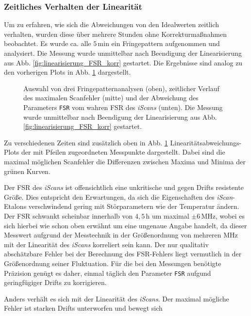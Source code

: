 \subsubsection{Zeitliches Verhalten
der Linearität}\label{subsubsec:linearitaet_verlauf}
Um zu erfahren, wie
sich die Abweichungen von den Idealwerten zeitlich verhalten, wurden diese über
mehrere Stunden ohne Korrekturmaßnahmen beobachtet. Es wurde ca. alle $5\,$min ein Fringepattern aufgenommen und analysiert. Die Messung wurde unmittelbar nach Beendigung der Linearisierung aus Abb.
\ref{fig:linearisierung_FSR_korr} gestartet.
Die Ergebnisse sind analog zu den vorherigen Plots in Abb.
\ref{fig:linearitaet_verlauf} dargestellt.
\begin{figure}
	 	\centering
	 	\footnotesize
		
		\caption[Linearität \textit{iScan}, zeitlicher Verlauf]{Auswahl von drei
		Fringepatternanalysen (oben), zeitlicher Verlauf des maximalen Scanfehler
		(mitte) und der Abweichung des Parameters \lstinline|FSR| vom wahren FSR des
		\textit{iScans} (unten). Die Messung wurde unmittelbar nach Beendigung der
		Linearisierung aus Abb. \ref{fig:linearisierung_FSR_korr} gestartet.}
		\label{fig:linearitaet_verlauf}
\end{figure}
Zu verschiedenen Zeiten sind zusätzlich oben in Abb.
\ref{fig:linearitaet_verlauf} Linearitätsabweichungs-Plots der mit Pfeilen
zugeordneten Messpunkte dargestellt. Dabei sind die maximal möglichen Scanfehler
die Differenzen zwischen Maxima und Minima der grünen Kurven.\par
Der FSR des
\textit{iScans} ist offensichtlich eine unkritische und gegen Drifts
resistente Größe. Dies entspricht den Erwartungen, da sich die Eigenschaften des
\textit{iScan}-Etalons verschwindend gering mit Störparametern wie der
Temperatur ändern. Der FSR schwankt scheinbar innerhalb von $4,5\,$h um maximal
$\pm6\,$MHz, wobei es sich hierbei wie schon oben erwähnt um eine ungenaue
Angabe handelt, da dieser Messwert aufgrund der Messtechnik in der Größenordnung von mehreren MHz mit der Linearität des \textit{iScans} korreliert sein kann. Der nur qualitativ abschätzbare Fehler bei der Berechnung des FSR-Fehlers liegt vermutlich in der Größenordnung seiner
Fluktuation. Für die bei den Messungen benötigte Präzision genügt es daher,
einmal täglich den Parameter \lstinline|FSR| aufgund geringfügiger Drifts zu korrigieren.\par
Anders verhält es sich mit der Linearität des \textit{iScans}.
Der maximal mögliche Fehler ist starken Drifts unterworfen und bewegt sich
